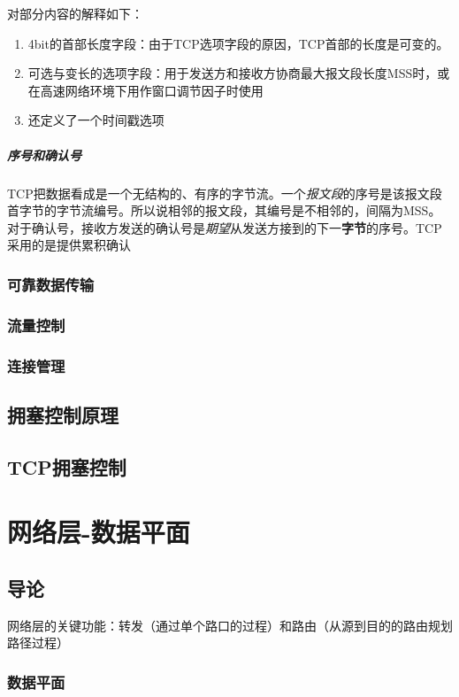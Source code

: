 \documentclass[]{report}
\begin{document}
\begin{figure}[h!]
\begin{minipage}{20em}
				\end{minipage}
			\end{figure}
			对部分内容的解释如下：
			\begin{enumerate}
				\item 4bit的首部长度字段：由于TCP选项字段的原因，TCP首部的长度是可变的。
				\item 可选与变长的选项字段：用于发送方和接收方协商最大报文段长度MSS时，或在高速网络环境下用作窗口调节因子时使用
				\item 还定义了一个时间戳选项
			\end{enumerate}
			\paragraph{序号和确认号}
			TCP把数据看成是一个无结构的、有序的字节流。一个\textit{报文段}的序号是该报文段首字节的字节流编号。所以说相邻的报文段，其编号是不相邻的，间隔为MSS。对于确认号，接收方发送的确认号是\textit{期望}从发送方接到的下一\textbf{字节}的序号。TCP采用的是提供累积确认
		\subsection{可靠数据传输}
		\subsection{流量控制}
		\subsection{连接管理}
	\section{拥塞控制原理}
	\section{TCP拥塞控制}

	\chapter{网络层-数据平面}
	\section{导论}
		网络层的关键功能：转发（通过单个路口的过程）和路由（从源到目的的路由规划路径过程）
		\subsection{数据平面}
\end{document}
